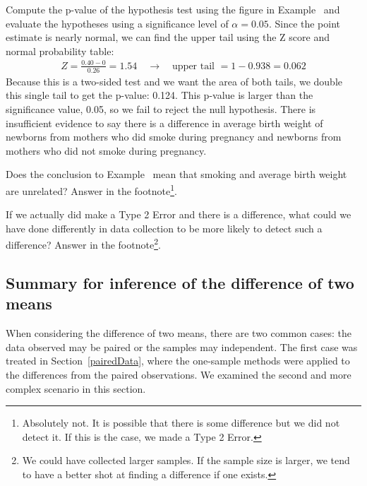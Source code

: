 \begin{example}{Compute the p-value of the hypothesis test using the figure in Example~ and evaluate the hypotheses using a significance level of $\alpha=0.05$.} \label{babySmokeHTForWeightComputePValueAndEvalHT}
Since the point estimate is nearly normal, we can find the upper tail using the Z score and normal probability table:
\begin{eqnarray*}
Z = \frac{0.40 - 0}{0.26} = 1.54 \quad \to \quad \text{upper tail } = 1 - 0.938 = 0.062
\end{eqnarray*}
Because this is a two-sided test and we want the area of both tails, we double this single tail to get the p-value: 0.124. This p-value is larger than the significance value, 0.05, so we fail to reject the null hypothesis. There is insufficient evidence to say there is a difference in average birth weight of newborns from mothers who did smoke during pregnancy and newborns from mothers who did not smoke during pregnancy.
\end{example}

\begin{exercise}
Does the conclusion to Example~ mean that smoking and average birth weight are unrelated? Answer in the footnote\footnote{Absolutely not. It is possible that there is some difference but we did not detect it. If this is the case, we made a Type 2 Error.}.
\end{exercise}

\begin{exercise} \label{babySmokeHTIDingHowToDetectDifferences}
If we actually did make a Type 2 Error and there is a difference, what could we have done differently in data collection to be more likely to detect such a difference? Answer in the footnote\footnote{We could have collected larger samples. If the sample size is larger, we tend to have a better shot at finding a difference if one exists.}.
\end{exercise}

\subsection{Summary for inference of the difference of two means}

When considering the difference of two means, there are two common cases: the data observed may be paired or the samples may independent. The first case was treated in Section~\ref{pairedData}, where the one-sample methods were applied to the differences from the paired observations. We examined the second and more complex scenario in this section.

